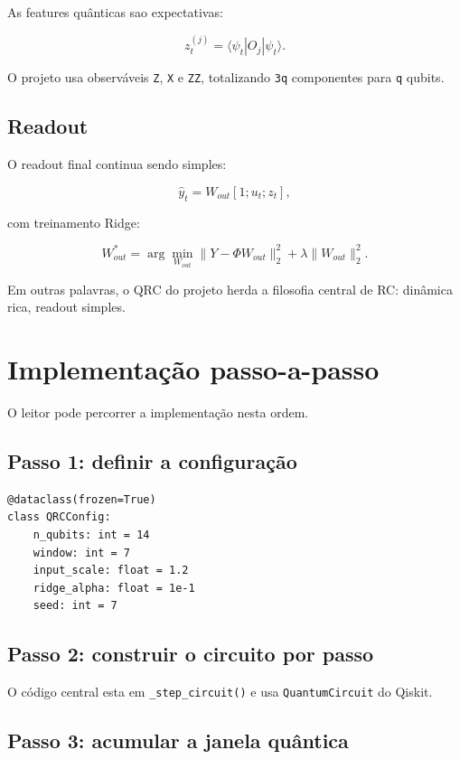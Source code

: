 \documentclass[12pt]{article}
\begin{document}
As features quânticas sao expectativas:

\[
z_t^{(j)} = \langle \psi_t | O_j | \psi_t \rangle.
\]

O projeto usa observáveis \texttt{Z}, \texttt{X} e \texttt{ZZ}, totalizando \texttt{3q} componentes para \texttt{q} qubits.

\subsection{Readout}\label{34-readout}

O readout final continua sendo simples:

\[
\hat{y}_t = W_{out} [1; u_t; z_t],
\]

com treinamento Ridge:

\[
W_{out}^* = \arg\min_{W_{out}} \|Y - \Phi W_{out}\|_2^2 + \lambda \|W_{out}\|_2^2.
\]

Em outras palavras, o QRC do projeto herda a filosofia central de RC: dinâmica rica, readout simples.

\section{Implementação passo-a-passo}\label{4-implementauxe7uxe3o-passo-a-passo}

O leitor pode percorrer a implementação nesta ordem.

\subsection{Passo 1: definir a configuração}\label{41-passo-1-definir-a-configurauxe7uxe3o}

\begin{verbatim}
@dataclass(frozen=True)
class QRCConfig:
    n_qubits: int = 14
    window: int = 7
    input_scale: float = 1.2
    ridge_alpha: float = 1e-1
    seed: int = 7
\end{verbatim}

\subsection{Passo 2: construir o circuito por passo}\label{42-passo-2-construir-o-circuito-por-passo}

O código central esta em \texttt{\_step\_circuit()} e usa \texttt{QuantumCircuit} do Qiskit.

\subsection{Passo 3: acumular a janela quântica}\label{43-passo-3-acumular-a-janela-quuxe2ntica}
\end{document}
